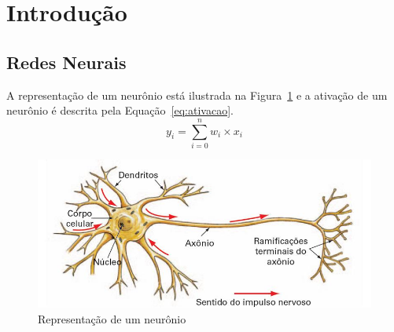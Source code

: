 \documentclass[a4paper, 12pt]{article}
\begin{document}
\section{Introdução}
\subsection{Redes Neurais}
A representação de um neurônio está ilustrada na Figura~\ref{fig:neuronio} e a ativação de um neurônio é descrita pela Equação~\ref{eq:ativacao}.
\begin{equation}
y_i = \sum_{i=0}^{n} w_i \times x_i
\end{equation}\label{eq:ativacao}

\begin{figure}[htb]
	\centering
	\includegraphics[scale=.5]{neuronio}
	\caption{Representação de um neurônio}\label{fig:neuronio}
\end{figure}
\end{document}
